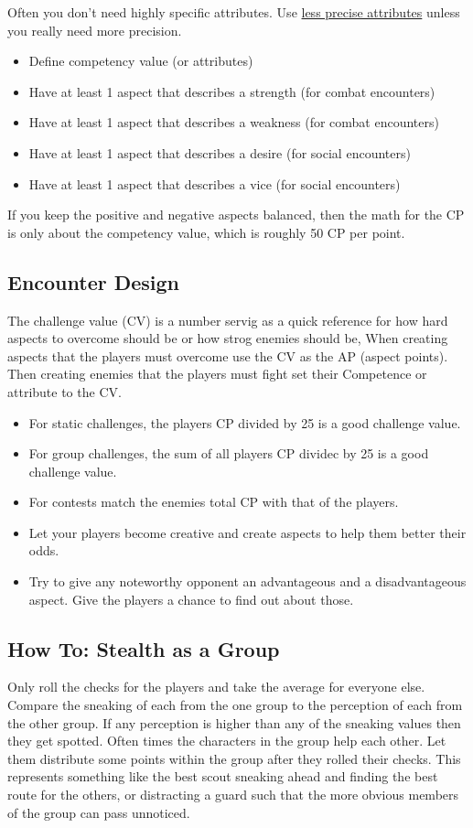 \documentclass[11pt]{article}
\begin{document}
{Often you don't need highly specific attributes. Use \hyperref[sec:org7960fac]{less precise attributes} unless you really need more precision.
\begin{itemize}
\item Define competency value (or attributes)
\item Have at least 1 aspect that describes a strength (for combat encounters)
\item Have at least 1 aspect that describes a weakness (for combat encounters)
\item Have at least 1 aspect that describes a desire (for social encounters)
\item Have at least 1 aspect that describes a vice (for social encounters)
\end{itemize}
If you keep the positive and negative aspects balanced, then the math for the CP is only about the competency value, which is roughly 50 CP per point.
\subsection{Encounter Design}
\label{sec:org78d94a3}

The challenge value (CV) is a number servig as a quick reference for how hard aspects to overcome should be or how strog enemies should be, When creating aspects that the players must overcome use the CV as the AP (aspect points). Then creating enemies that the players must fight set their Competence or attribute to the CV.
\begin{itemize}
\item For static challenges, the players CP divided by 25 is a good challenge value.
\item For group challenges, the sum of all players CP dividec by 25 is a good challenge value.
\item For contests match the enemies total CP with that of the players.
\item Let your players become creative and create aspects to help them better their odds.
\item Try to give any noteworthy opponent an advantageous and a disadvantageous aspect. Give the players a chance to find out about those.
\end{itemize}
\subsection{How To: Stealth as a Group}
\label{sec:orgefc82f7}

Only roll the checks for the players and take the average for everyone else. Compare the sneaking of each from the one group to the perception of each from the other group. If any perception is higher than any of the sneaking values then they get spotted.
Often times the characters in the group help each other. Let them distribute some points within the group after they rolled their checks. This represents something like the best scout sneaking ahead and finding the best route for the others, or distracting a guard such that the more obvious members of the group can pass unnoticed.
}
\end{document}
